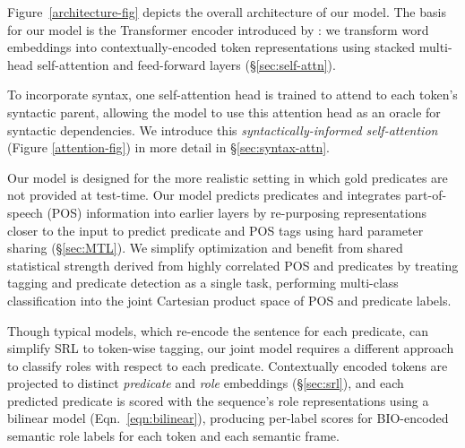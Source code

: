 \documentclass[11pt,a4paper]{article}
\begin{document}
Figure~\ref{architecture-fig} depicts the overall architecture of our model. The basis for our model is the Transformer encoder introduced by \citet{vaswani2017attention}: we transform word embeddings into contextually-encoded token representations using stacked multi-head self-attention and feed-forward layers (\S\ref{sec:self-attn}). 

To incorporate syntax, one self-attention head is trained to attend to each token's syntactic parent, allowing the model to use this attention head as an oracle for syntactic dependencies. We introduce this \emph{syntactically-informed self-attention} (Figure \ref{attention-fig}) in more detail in \S\ref{sec:syntax-attn}. 

Our model is designed for the more realistic setting in which gold predicates are not provided at test-time. Our model predicts predicates and integrates part-of-speech (POS) information into earlier layers by re-purposing representations closer to the input to predict predicate and POS tags using hard parameter sharing (\S\ref{sec:MTL}). We simplify optimization and benefit from shared statistical strength derived from highly correlated POS and predicates by treating tagging and predicate detection as a single task, performing multi-class classification into the joint Cartesian product space of POS and predicate labels. 

Though typical models, which re-encode the sentence for each predicate, can simplify SRL to token-wise tagging, our joint model requires a different approach to classify roles with respect to each predicate. Contextually encoded tokens are projected to distinct \emph{predicate} and \emph{role} embeddings (\S\ref{sec:srl}), and each predicted predicate is scored with the sequence's role representations using a bilinear model (Eqn.~\ref{eqn:bilinear}), producing per-label scores for BIO-encoded semantic role labels for each token and each semantic frame. 
\end{document}
